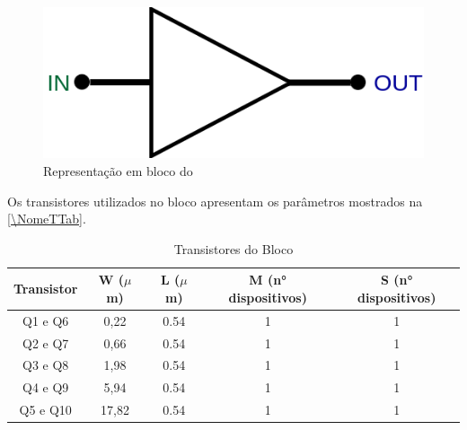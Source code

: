 \begin{figure}[htb]
 \label{NomePFig}
 \centering
    \centering
    \caption{Representa{\c c}\~ao em bloco do \NomeBloco} \label{NomeSFig2}
    \includegraphics[scale=0.3]{Circuitos/Buffer_block.png}
\end{figure}


Os transistores utilizados no bloco \NomeBloco{} apresentam os par\^ametros mostrados na \autoref{\NomeTTab}.

\begin{table}[htb]
\caption{Transistores do Bloco \NomeBloco}
\label{\NomeTTab}
\centering
\begin{tabular}{ccccc}
\toprule
Transistor & W ($\mu$m)  & L ($\mu$m)           & M (n° dispositivos) & S (n° dispositivos)\\
\midrule \midrule
Q1 e Q6 & 0,22 & 0.54 & 1 & 1\\
\midrule
Q2 e Q7 & 0,66 & 0.54 & 1 & 1\\
\midrule
Q3 e Q8 & 1,98 & 0.54 & 1 & 1\\
\midrule
Q4 e Q9 & 5,94 & 0.54 & 1 & 1\\
\midrule
Q5 e Q10 & 17,82 & 0.54 & 1 & 1\\
\bottomrule
\end{tabular}
\end{table}
\clearpage